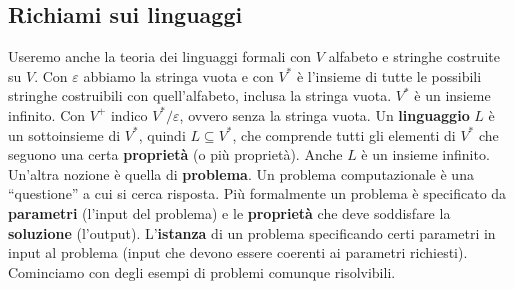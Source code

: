 \subsection{Richiami sui linguaggi}
Useremo anche la teoria dei linguaggi formali con $V$ alfabeto e stringhe
costruite su $V$. Con $\varepsilon$ abbiamo la stringa vuota e con $V^*$ è
l'insieme di tutte le possibili stringhe costruibili con quell'alfabeto, inclusa
la stringa vuota. $V^*$ è un insieme infinito. Con $V^+$ indico
$V^*/\varepsilon$, ovvero senza la stringa vuota. Un \textbf{linguaggio} $L$ è
un sottoinsieme di $V^*$, quindi $L\subseteq V^*$, che comprende tutti gli
elementi di $V^*$ che seguono una certa \textbf{proprietà} (o più
proprietà). Anche $L$ è un insieme infinito.\\
Un'altra nozione è quella di \textbf{problema}. Un problema computazionale è una
``questione'' a cui si cerca risposta. Più formalmente un problema è specificato
da \textbf{parametri} (l'input del problema) e le \textbf{proprietà} che deve
soddisfare la \textbf{soluzione} (l'output). L'\textbf{istanza} di un problema
specificando certi parametri in input al problema (input che devono essere
coerenti ai parametri richiesti).\\
Cominciamo con degli esempi di problemi comunque risolvibili.

